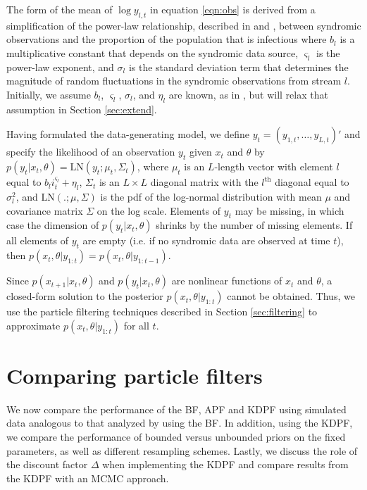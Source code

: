 \documentclass{elsarticle}
\begin{document}
The form of the mean of $\log y_{l,t}$ in equation \eqref{eqn:obs} is derived from a simplification of the power-law relationship, described in \citet{skvortsov2012monitoring} and \citet{Gins:Mohe:Pate:Bram:Smol:Bril:dete:2009}, between syndromic observations and the proportion of the population that is infectious where $b_l$ is a multiplicative constant that depends on the syndromic data source, $\varsigma_l$ is the power-law exponent, and $\sigma_l$ is the standard deviation term that determines the magnitude of random fluctuations in the syndromic observations from stream $l$. Initially, we assume $b_l$, $\varsigma_l$, $\sigma_l$, and $\eta_l$ are known, as in \citep{skvortsov2012monitoring}, but will relax that assumption in Section \ref{sec:extend}.

Having formulated the data-generating model, we define $y_t = (y_{1,t},\ldots,y_{L,t})'$ and specify the likelihood of an observation $y_t$ given $x_t$ and $\theta$ by $p(y_t|x_t,\theta) = \mbox{LN}(y_t;\mu_t,\Sigma_t)$, where $\mu_t$ is an $L$-length vector with element $l$ equal to $b_li_t^{\varsigma_l} + \eta_l$, $\Sigma_t$ is an $L \times L$ diagonal matrix with the $l^{\mbox{th}}$ diagonal equal to $\sigma_l^2$, and $\mbox{LN}(.;\mu,\Sigma)$ is the pdf of the log-normal distribution with mean $\mu$ and covariance matrix $\Sigma$ on the log scale. Elements of $y_t$ may be missing, in which case the dimension of $p(y_t|x_t,\theta)$ shrinks by the number of missing elements. If all elements of $y_t$ are empty (i.e. if no syndromic data are observed at time $t$), then $p(x_t,\theta|y_{1:t})=p(x_t,\theta|y_{1:t-1})$.

Since $p(x_{t+1}|x_t,\theta)$ and $p(y_t|x_t,\theta)$ are nonlinear functions of $x_t$ and $\theta$, a closed-form solution to the posterior $p(x_t,\theta|y_{1:t})$ cannot be obtained. Thus, we use the particle filtering techniques described in Section \ref{sec:filtering} to approximate $p(x_t,\theta|y_{1:t})$ for all $t$.

\section{Comparing particle filters} \label{sec:results}

We now compare the performance of the BF, APF and KDPF using simulated data analogous to that analyzed by \citet{skvortsov2012monitoring} using the BF. In addition, using the KDPF, we compare the performance of bounded versus unbounded priors on the fixed parameters, as well as different resampling schemes. Lastly, we discuss the role of the discount factor $\Delta$ when implementing the KDPF and compare results from the KDPF with an MCMC approach.
\end{document}
